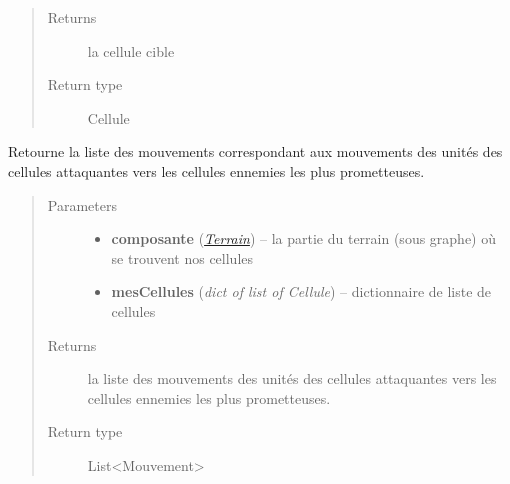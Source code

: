 \documentclass[letterpaper,10pt,english]{sphinxmanual}
\begin{document}
\begin{fulllineitems}
\begin{fulllineitems}
\begin{quote}
\begin{description}
\item[{Returns}] \leavevmode
la cellule cible

\item[{Return type}] \leavevmode
Cellule

\end{description}\end{quote}

\end{fulllineitems}


\begin{fulllineitems}
\label{index:StrategieAnalyse.StrategieAnalyse.envoyerUnitesAttaquantes}
Retourne la liste des mouvements correspondant aux mouvements des unités des cellules attaquantes vers les cellules ennemies les plus prometteuses.
\begin{quote}\begin{description}
\item[{Parameters}] \leavevmode\begin{itemize}
\item {} 
\textbf{composante} ({\hyperref[index:module-Terrain]{\emph{Terrain}}}) -- la partie du terrain (sous graphe) où se trouvent nos cellules

\item {} 
\textbf{mesCellules} (\emph{dict of list of Cellule}) -- dictionnaire de liste de cellules

\end{itemize}

\item[{Returns}] \leavevmode
la liste des mouvements des unités des cellules attaquantes vers les cellules ennemies les plus prometteuses.

\item[{Return type}] \leavevmode
List\textless{}Mouvement\textgreater{}

\end{description}\end{quote}

\end{fulllineitems}



\end{fulllineitems}
\end{document}
